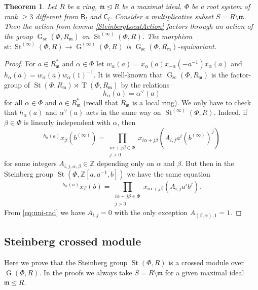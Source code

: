 \documentclass{article}
\numberwithin{equation}{section}
\newtheorem{theorem}{Theorem}
\theoremstyle{definition}
\theoremstyle{remark}
\DeclareMathOperator\St{St}
\DeclareMathOperator\GG{G}
\DeclareMathOperator\Torus{T}
\newcommand{\up}[2]{{^{#1}\!{#2}}}
\newcommand{\rB}{\mathsf{B}}
\newcommand{\rC}{\mathsf{C}}
\begin{document}
\begin{theorem}\label{ChevalleyLocalAction}
 Let \(R\) be a ring, \(\mathfrak m \trianglelefteq R\) be a maximal ideal, \(\Phi\) be a root system of rank \(\geq 3\) different from \(\rB_l\) and \(\rC_l\). Consider a multiplicative subset \(S = R \setminus \mathfrak m\). Then the action from lemma \ref{SteinbergLocalAction} factors through an action of the group \(\GG_{\mathrm{sc}}(\Phi, R_{\mathfrak m})\) on \(\St^{(\infty)}(\Phi, R)\). The morphism \(\mathrm{st} \colon \St^{(\infty)}(\Phi, R) \to \GG^{(\infty)}(\Phi, R)\) is \(\GG_{\mathrm{sc}}(\Phi, R_{\mathfrak m})\)-equivariant.
\end{theorem}
\begin{proof}
 For \(a \in R_{\mathfrak m}^*\) and \(\alpha \in \Phi\) let \(w_\alpha(a) = x_\alpha(a) x_{-\alpha}(-a^{-1}) x_\alpha(a)\) and \(h_\alpha(a) = w_\alpha(a) w_\alpha(1)^{-1}\). It is well-known that \(\GG_{\mathrm{sc}}(\Phi, R_{\mathfrak m})\) is the factor-group of \(\St(\Phi, R_{\mathfrak m}) \rtimes \Torus(\Phi, R_{\mathfrak m})\) by the relations
 \[h_\alpha(a) = \alpha^\vee(a)\]
 for all \(\alpha \in \Phi\) and \(a \in R_{\mathfrak m}^*\) (recall that \(R_{\mathfrak m}\) is a local ring). We only have to check that \(h_\alpha(a)\) and \(\alpha^\vee(a)\) acts in the same way on \(\St^{(\infty)}(\Phi, R)\). Indeed, if \(\beta \in \Phi\) is linearly independent with \(\alpha\), then
 \[\up{h_\alpha(a)}{x_\beta(b^{(\infty)})} = \prod_{\substack{i\alpha + j\beta \in \Phi\\ j > 0}} x_{i\alpha + j\beta}(A_{i, j} a^i (b^{(\infty)})^j)\]
 for some integers \(A_{i, j, \alpha, \beta} \in \mathbb Z\) depending only on \(\alpha\) and \(\beta\). But then in the Steinberg group \(\St(\Phi, \mathbb Z[a, a^{-1}, b])\) we have the same equation
 \[\up{h_\alpha(a)}{x_\beta(b)} = \prod_{\substack{i\alpha + j\beta \in \Phi\\ j > 0}} x_{i\alpha + j\beta}(A_{i, j} a^i b^j).\]
 From \eqref{eq:uni-rad} we have \(A_{i, j} = 0\) with the only exception \(A_{(\beta, \alpha), 1} = 1\).
\end{proof}


\subsection{Steinberg crossed module}

Here we prove that the Steinberg group \(\St(\Phi, R)\) is a crossed module over \(\GG(\Phi, R)\). In the proofs we always take \(S = R \setminus \mathfrak m\) for a given maximal ideal \(\mathfrak m \trianglelefteq R\).
\end{document}
